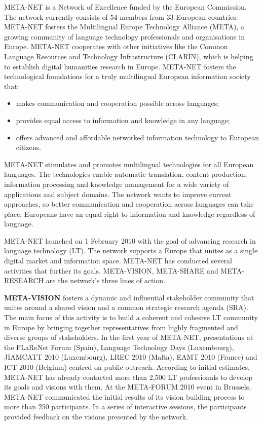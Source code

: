  \begin{multicols}{2}
  META-NET is a Network of Excellence funded by the European Commission. The network currently consists of 54 members from 33 European countries\cite{rehm2011}. META-NET fosters the Multilingual Europe Technology Alliance (META), a growing community of language technology professionals and organisations in Europe. META-NET cooperates with other initiatives like the Common Language Resources and Technology Infrastructure (CLARIN), which is helping to establish digital humanities research in Europe. META-NET fosters the technological foundations for a truly multilingual European information society that:

  \begin{itemize}
  \item makes communication and cooperation possible across languages;
  \item provides equal access to information and knowledge in any language;
  \item offers advanced and affordable networked information technology to European citizens.
  \end{itemize}

  META-NET stimulates and promotes multilingual technologies for all European languages. The technologies enable automatic translation, content production, information processing and knowledge management for a wide variety of applications and subject domains. The network wants to improve current approaches, so better communication and cooperation across languages can take place. Europeans have an equal right to information and knowledge regardless of language.

  META-NET launched on 1 February 2010 with the goal of advancing research in language technology (LT). The network supports a Europe that unites as a single digital market and information space. META-NET has conducted several activities that further its goals. META-VISION, META-SHARE and META-RESEARCH are the network’s three lines of action.

  \textbf{META-VISION} fosters a dynamic and influential stakeholder community that unites around a shared vision and a common strategic research agenda (SRA). The main focus of this activity is to build a coherent and cohesive LT community in Europe by bringing together representatives from highly fragmented and diverse groups of stakeholders. In the first year of META-NET, presentations at the FLaReNet Forum (Spain), Language Technology Days (Luxembourg), JIAMCATT 2010 (Luxembourg), LREC 2010 (Malta), EAMT 2010 (France) and ICT 2010 (Belgium) centred on public outreach. According to initial estimates, META-NET has already contacted more than 2,500 LT professionals to develop its goals and visions with them. At the META-FORUM 2010 event in Brussels, META-NET communicated the initial results of its vision building process to more than 250 participants. In a series of interactive sessions, the participants provided feedback on the visions presented by the network. 


\end{multicols}
